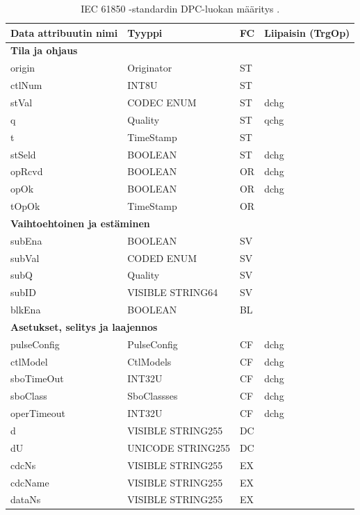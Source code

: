 \begin{table}[ht!]
	\caption{IEC 61850 -standardin DPC-luokan määritys \cite[s.~44]{IEC61850-7-3}.}
	\label{tab:iec61850-DPC-class-definition}
	\begin{tabular}{l | l | l | l}
		\hline
		\textbf{Data attribuutin nimi} & \textbf{Tyyppi} & \textbf{FC} & \textbf{Liipaisin (TrgOp)} \\
		\hline
		\multicolumn{4}{l}{\textbf{Tila ja ohjaus}} \\
		\hline
		origin & Originator & ST &  \\
		ctlNum & INT8U & ST &  \\
		stVal & CODEC ENUM & ST & dchg \\
		q & Quality & ST & qchg \\
		t & TimeStamp & ST &  \\
		stSeld & BOOLEAN & ST & dchg \\
		opRcvd & BOOLEAN & OR & dchg \\
		opOk & BOOLEAN & OR & dchg \\
		tOpOk & TimeStamp & OR &  \\
		\hline
		\multicolumn{4}{l}{\textbf{Vaihtoehtoinen ja estäminen}} \\
		\hline
		subEna & BOOLEAN & SV &  \\
		subVal & CODED ENUM & SV &  \\
		subQ & Quality & SV &  \\
		subID & VISIBLE STRING64 & SV &  \\
		blkEna & BOOLEAN & BL &  \\
		\hline
		\multicolumn{4}{l}{\textbf{Asetukset, selitys ja laajennos}} \\
		\hline
		pulseConfig & PulseConfig & CF & dchg \\
		ctlModel & CtlModels & CF & dchg \\
		sboTimeOut & INT32U & CF & dchg \\
		sboClass & SboClassses & CF & dchg \\
		operTimeout & INT32U & CF & dchg \\
		d & VISIBLE STRING255 & DC &  \\
		dU & UNICODE STRING255 & DC &  \\
		cdcNs & VISIBLE STRING255 & EX &  \\
		cdcName & VISIBLE STRING255 & EX &  \\
		dataNs & VISIBLE STRING255 & EX &  \\
		\hline
	\end{tabular}
\end{table}

